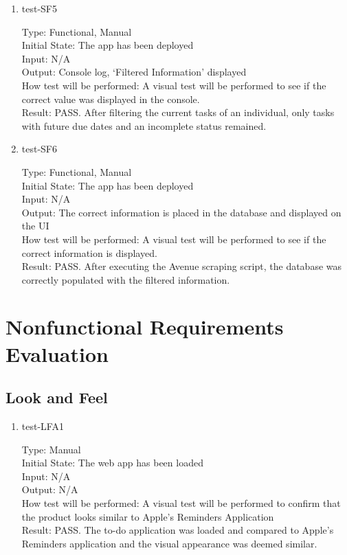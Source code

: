 \documentclass[12pt, titlepage]{article}
\begin{document}
\begin{enumerate}
\item{test-SF5\\}

Type: Functional, Manual\\
Initial State: The app has been deployed\\
Input: N/A\\
Output: Console log, ‘Filtered Information’ displayed\\
How test will be performed: A visual test will be performed to see if the correct value was displayed in the console.\\
Result: PASS. After filtering the current tasks of an individual, only tasks with future due dates and an incomplete status remained. 

\item{test-SF6\\}

Type: Functional, Manual\\
Initial State: The app has been deployed\\
Input: N/A\\
Output: The correct information is placed in the database and displayed on the UI\\
How test will be performed: A visual test will be performed to see if the correct information is displayed.\\
Result: PASS. After executing the Avenue scraping script, the database was correctly populated with the filtered information. 

\end{enumerate}

\section{Nonfunctional Requirements Evaluation}

\subsection{Look and Feel}

\begin{enumerate}
\item{test-LFA1\\}

Type: Manual\\
Initial State: The web app has been loaded\\
Input: N/A\\
Output: N/A\\
How test will be performed: A visual test will be performed to confirm that the product looks similar to Apple’s Reminders Application\\
Result: PASS. The to-do application was loaded and compared to Apple’s Reminders application and the visual appearance was deemed similar. 

\end{enumerate}
\end{document}
